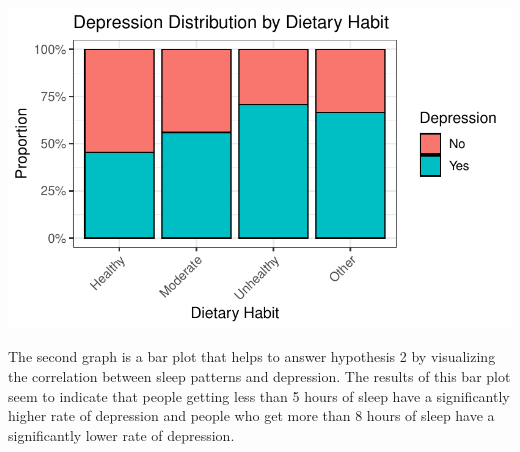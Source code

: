 \documentclass[
  letterpaper,
  DIV=11,
  numbers=noendperiod]{scrartcl}
\begin{document}
\includegraphics{Final_Project-Step-2_files/figure-pdf/unnamed-chunk-27-1.pdf}

The second graph is a bar plot that helps to answer hypothesis 2 by
visualizing the correlation between sleep patterns and depression. The
results of this bar plot seem to indicate that people getting less than
5 hours of sleep have a significantly higher rate of depression and
people who get more than 8 hours of sleep have a significantly lower
rate of depression.
\end{document}
